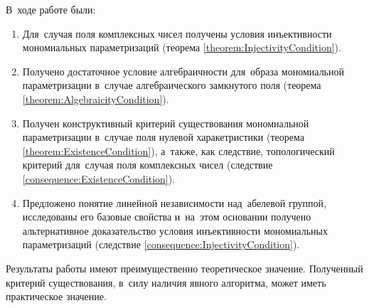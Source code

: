 \pagebreak
{}
В~ходе работе были:
\begin{enumerate}
  \item Для~случая поля комплексных чисел получены условия инъективности мономиальных параметризаций (теорема \ref{theorem:InjectivityCondition}).
  \item Получено достаточное условие алгебраичности для~образа мономиальной параметризации
        в~случае алгебраического замкнутого поля (теорема \ref{theorem:AlgebraicityCondition}).
  \item Получен конструктивный критерий существования мономиальной параметризации
        в~случае поля нулевой харакетристики (теорема \ref{theorem:ExistenceCondition}), а~также,
        как следствие, топологический критерий для~случая поля комплексных чисел (следствие \ref{consequence:ExistenceCondition}).
  \item Предложено понятие линейной независимости над~абелевой группой, исследованы его базовые свойства
        и~на~этом основании получено альтернативное доказательство условия инъективности мономиальных
        параметризаций (следствие \ref{consequence:InjectivityCondition}).
\end{enumerate}

Результаты работы имеют преимущественно теоретическое значение. Полученный критерий существования,
в~силу наличия явного алгоритма, может иметь практическое значение.

